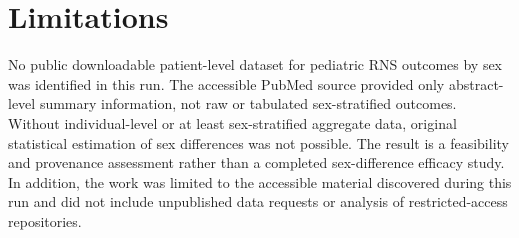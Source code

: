 \documentclass[11pt]{article}
\begin{document}
\section{Limitations}
No public downloadable patient-level dataset for pediatric RNS outcomes by sex was identified in this run. The accessible PubMed source provided only abstract-level summary information, not raw or tabulated sex-stratified outcomes. Without individual-level or at least sex-stratified aggregate data, original statistical estimation of sex differences was not possible. The result is a feasibility and provenance assessment rather than a completed sex-difference efficacy study. In addition, the work was limited to the accessible material discovered during this run and did not include unpublished data requests or analysis of restricted-access repositories.



\end{document}
